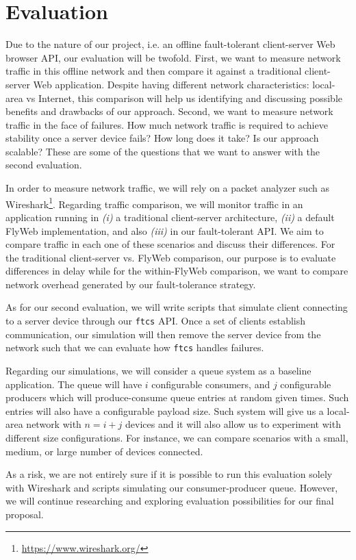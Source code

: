 \section{Evaluation}
\label{sec:evaluation}

Due to the nature of our project, i.e. an offline fault-tolerant client-server Web browser API, our evaluation will be twofold. First, we want to measure network traffic in this offline network and then compare it against a traditional client-server Web application. Despite having different network characteristics: local-area vs Internet, this comparison will help us identifying and discussing possible benefits and drawbacks of our approach. Second, we want to measure network traffic in the face of failures. How much network traffic is required to achieve stability once a server device fails? How long does it take? Is our approach scalable? These are some of the questions that we want to answer with the second evaluation.

In order to measure network traffic, we will rely on a packet analyzer such as Wireshark\footnote{\url{https://www.wireshark.org/}}. Regarding traffic comparison, we will monitor traffic in an application running in {\it (i)} a traditional client-server architecture, {\it (ii)} a default FlyWeb implementation, and also {\it (iii)} in our fault-tolerant API. We aim to compare traffic in each one of these scenarios and discuss their differences. For the traditional client-server vs. FlyWeb comparison, our purpose is to evaluate differences in delay while for the within-FlyWeb comparison, we want to compare network overhead generated by our fault-tolerance strategy. 

As for our second evaluation, we will write scripts that simulate client connecting to a server device through our \texttt{ftcs} API. Once a set of clients establish communication, our simulation will then remove the server device from the network such that we can evaluate how \texttt{ftcs} handles failures. 

Regarding our simulations, we will consider a queue system as a baseline application. The queue will have $i$ configurable consumers, and $j$ configurable producers which will produce-consume queue entries at random given times. Such entries will also have a configurable payload size. Such system will give us a local-area network with $n = i + j$ devices and it will also allow us to experiment with different size configurations. For instance, we can compare scenarios with a small, medium, or large number of devices connected.

As a risk, we are not entirely sure if it is possible to run this evaluation solely with Wireshark and scripts simulating our consumer-producer queue. However, we will continue researching and exploring evaluation possibilities for our final proposal.